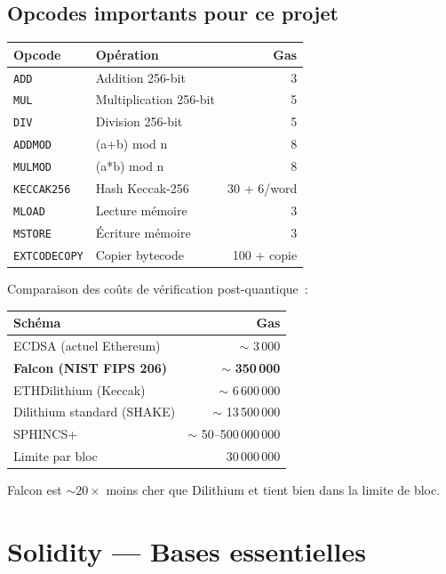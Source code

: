 \documentclass[12pt, a4paper]{article}
\begin{document}
\subsection{Opcodes importants pour ce projet}

\begin{center}
\begin{tabular}{llr}
\toprule
\textbf{Opcode} & \textbf{Opération} & \textbf{Gas} \\
\midrule
\texttt{ADD} & Addition 256-bit & 3 \\
\texttt{MUL} & Multiplication 256-bit & 5 \\
\texttt{DIV} & Division 256-bit & 5 \\
\texttt{ADDMOD} & (a+b) mod n & 8 \\
\texttt{MULMOD} & (a*b) mod n & 8 \\
\texttt{KECCAK256} & Hash Keccak-256 & 30 + 6/word \\
\texttt{MLOAD} & Lecture mémoire & 3 \\
\texttt{MSTORE} & Écriture mémoire & 3 \\
\texttt{EXTCODECOPY} & Copier bytecode & 100 + copie \\
\bottomrule
\end{tabular}
\end{center}

\begin{gasbox}
Comparaison des coûts de vérification post-quantique~:
\begin{center}
\begin{tabular}{lr}
\toprule
\textbf{Schéma} & \textbf{Gas} \\
\midrule
ECDSA (actuel Ethereum) & $\sim$ 3\,000 \\
\textbf{Falcon (NIST FIPS 206)} & $\sim$ \textbf{350\,000} \\
ETHDilithium (Keccak) & $\sim$ 6\,600\,000 \\
Dilithium standard (SHAKE) & $\sim$ 13\,500\,000 \\
SPHINCS+ & $\sim$ 50--500\,000\,000 \\
Limite par bloc & 30\,000\,000 \\
\bottomrule
\end{tabular}
\end{center}
Falcon est $\sim 20\times$ moins cher que Dilithium et tient bien dans la limite de bloc.
\end{gasbox}

\section{Solidity --- Bases essentielles}
\end{document}
